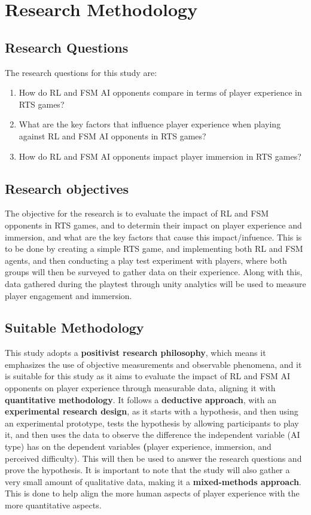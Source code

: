 \documentclass[conference]{IEEEtran}
\begin{document}
\section{Research Methodology}

\subsection{Research Questions}
The research questions for this study are:

\begin{enumerate}
	\item How do RL and FSM AI opponents compare in terms of player experience in RTS games?
	\item What are the key factors that influence player experience when playing against RL and FSM AI opponents in RTS games?
	\item How do RL and FSM AI opponents impact player immersion in RTS games?
\end{enumerate}

\subsection{Research objectives}

The objective for the research is to evaluate the impact of RL and FSM opponents in RTS games, and to determin their impact on player experience and immersion,
and what are the key factors that cause this impact/infuence. This is to be done by creating a simple RTS game, and implementing both RL and FSM agents,
and then conducting a play test experiment with players, where both groups will then be surveyed to gather data on their experience. Along with this,
data gathered during the playtest through unity analytics will be used to measure player engagement and immersion.

\subsection{Suitable Methodology}

This study adopts a \textbf{positivist research philosophy}, which means it emphasizes the use of objective measurements and observable phenomena, and it is suitable for this study as it aims
to evaluate the impact of RL and FSM AI opponents on player experience through measurable data, aligning it with \textbf{quantitative methodology}. It follows a \textbf{deductive approach}, with an \textbf{experimental research design},
as it starts with a hypothesis, and then using an experimental prototype, tests the hypothesis by allowing participants to play it, and then uses the data to observe the difference the independent variable (AI type)
has on the dependent variables \textbf(player experience, immersion, and perceived difficulty). This will then be used to answer the research questions and prove the hypothesis. It is important to note that the study
will also gather a very small amount of qualitative data, making it a \textbf{mixed-methods approach}. This is done to help align the more human aspects of player experience with the more quantitative aspects.
\end{document}
